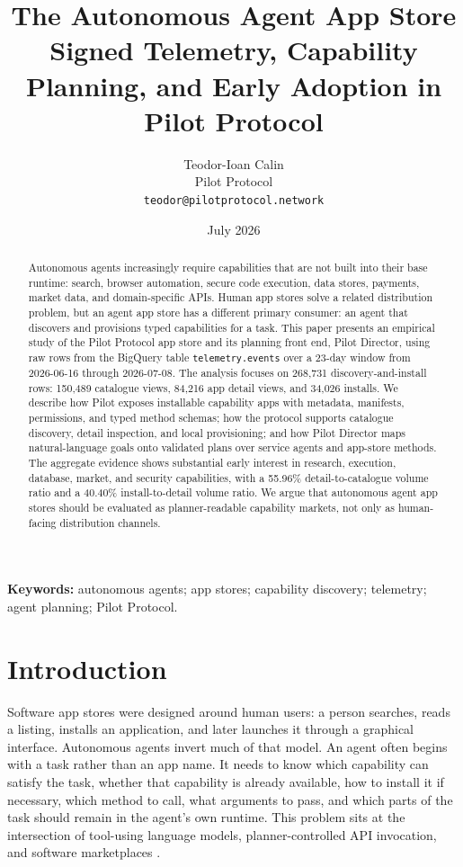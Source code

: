 \documentclass[10pt,twocolumn]{article}
\title{\textbf{The Autonomous Agent App Store}\\
\large Signed Telemetry, Capability Planning, and Early Adoption in Pilot Protocol}
\author{Teodor-Ioan Calin\\
Pilot Protocol\\
\texttt{teodor@pilotprotocol.network}}
\date{July 2026}
\newcommand{\pilot}{Pilot Protocol}
\newcommand{\director}{Pilot Director}
\begin{document}
\maketitle

\begin{abstract}
Autonomous agents increasingly require capabilities that are not built into their base runtime: search, browser automation, secure code execution, data stores, payments, market data, and domain-specific APIs. Human app stores solve a related distribution problem, but an agent app store has a different primary consumer: an agent that discovers and provisions typed capabilities for a task. This paper presents an empirical study of the \pilot{} app store and its planning front end, \director{}, using raw rows from the BigQuery table \texttt{telemetry.events} over a 23-day window from \mbox{2026-06-16} through \mbox{2026-07-08}. The analysis focuses on 268,731 discovery-and-install rows: 150,489 catalogue views, 84,216 app detail views, and 34,026 installs. We describe how Pilot exposes installable capability apps with metadata, manifests, permissions, and typed method schemas; how the protocol supports catalogue discovery, detail inspection, and local provisioning; and how \director{} maps natural-language goals onto validated plans over service agents and app-store methods. The aggregate evidence shows substantial early interest in research, execution, database, market, and security capabilities, with a 55.96\% detail-to-catalogue volume ratio and a 40.40\% install-to-detail volume ratio. We argue that autonomous agent app stores should be evaluated as planner-readable capability markets, not only as human-facing distribution channels.
\end{abstract}

\noindent\textbf{Keywords:} autonomous agents; app stores; capability discovery; telemetry; agent planning; Pilot Protocol.

\section{Introduction}
\label{sec:intro}

Software app stores were designed around human users: a person searches, reads a listing, installs an application, and later launches it through a graphical interface. Autonomous agents invert much of that model. An agent often begins with a task rather than an app name. It needs to know which capability can satisfy the task, whether that capability is already available, how to install it if necessary, which method to call, what arguments to pass, and which parts of the task should remain in the agent's own runtime. This problem sits at the intersection of tool-using language models, planner-controlled API invocation, and software marketplaces \cite{karpas2022mrkl,yao2023react,schick2023toolformer,patil2024gorilla,rochetTirole2003,jansen2013appstores}.
\end{document}
